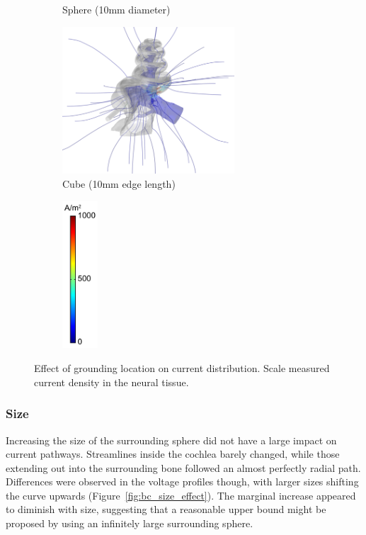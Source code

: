 \begin{figure}
\begin{subfigure}[t]{0.43\textwidth}
        \caption{Sphere (10mm diameter)}
        \label{fig:location_effect_streams_sphere}
    \end{subfigure}%
    \begin{subfigure}[t]{0.43\textwidth}
        \centering
        \includegraphics[height=5.5cm]{Simulations/BCs/streamlines-term4-cube_r5}
        \caption{Cube (10mm edge length)}
        \label{fig:location_effect_streams_cube}
    \end{subfigure}%
    \begin{subfigure}[t]{0.09\textwidth}
        \centering
        \includegraphics[height=5.5cm]{Validation/cbar_streamlines_short}
    \end{subfigure}%

	\caption[Effect of grounding location on current distribution]{Effect of
	grounding location on current distribution. Scale measured current density in
	the neural tissue.}
	\label{fig:location_effect_streams}
\end{figure}

\subsubsection{Size}

Increasing the size of the surrounding sphere did not have a large impact on
current pathways. Streamlines inside the cochlea barely changed, while those
extending out into the surrounding bone followed an almost perfectly radial
path. Differences were observed in the voltage profiles though, with larger
sizes shifting the curve upwards (Figure~\ref{fig:bc_size_effect}). The marginal
increase appeared to diminish with size, suggesting that a reasonable upper
bound might be proposed by using an infinitely large surrounding sphere.

